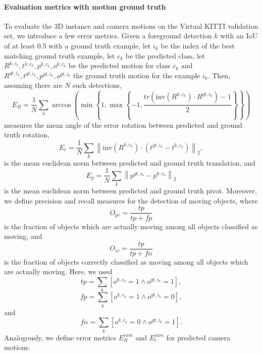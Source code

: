 \paragraph{Evaluation metrics with motion ground truth}
To evaluate the 3D instance and camera motions on the Virtual KITTI validation
set, we introduce a few error metrics.
Given a foreground detection $k$ with an IoU of at least $0.5$ with a ground truth example,
let $i_k$ be the index of the best matching ground truth example,
let $c_k$ be the predicted class,
let $R^{k,c_k}, t^{k,c_k}, p^{k,c_k}, o^{k,c_k}$ be the predicted motion for class $c_k$
and $R^{gt,i_k}, t^{gt,i_k}, p^{gt,i_k}, o^{gt,i_k}$ the ground truth motion for the example $i_k$.
Then, assuming there are $N$ such detections,
\begin{equation}
E_{R} = \frac{1}{N}\sum_k \arccos\left( \min\left\{1, \max\left\{-1, \frac{tr(\mathrm{inv}(R^{k,c_k}) \cdot R^{gt,i_k}) - 1}{2} \right\}\right\} \right)
\end{equation}
measures the mean angle of the error rotation between predicted and ground truth rotation,
\begin{equation}
E_{t} = \frac{1}{N}\sum_k  \left\lVert \mathrm{inv}(R^{k,c_k}) \cdot (t^{gt,i_k} - t^{k,c_k}) \right\rVert_2,
\end{equation}
is the mean euclidean norm between predicted and ground truth translation, and
\begin{equation}
E_{p} = \frac{1}{N}\sum_k \left\lVert p^{gt,i_k} - p^{k,c_k} \right\rVert_2
\end{equation}
is the mean euclidean norm between predicted and ground truth pivot.
Moreover, we define precision and recall measures for the detection of moving objects,
where
\begin{equation}
O_{pr} = \frac{tp}{tp + fp}
\end{equation}
is the fraction of objects which are actually moving among all objects classified as moving,
and
\begin{equation}
O_{rc} = \frac{tp}{tp + fn}
\end{equation}
is the fraction of objects correctly classified as moving among all objects which are actually moving.
Here, we used
\begin{equation}
tp = \sum_k [o^{k,c_k} = 1 \land o^{gt,i_k} = 1],
\end{equation}
\begin{equation}
fp = \sum_k [o^{k,c_k} = 1 \land o^{gt,i_k} = 0],
\end{equation}
and
\begin{equation}
fn = \sum_k [o^{k,c_k} = 0 \land o^{gt,i_k} = 1].
\end{equation}
Analogously, we define error metrics $E_{R}^{cam}$ and $E_{t}^{cam}$ for
predicted camera motions.

